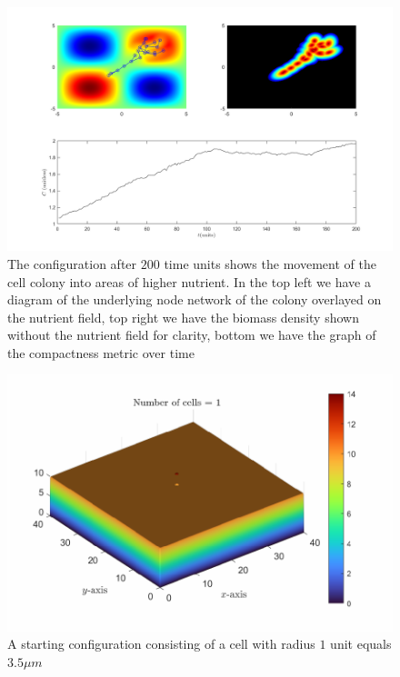 \begin{figure}[h]
    \centering
    \includegraphics[width=1\textwidth]{chapter1/figures/sine_wave_nutrient_field.png}
    \caption{The configuration after $200$ time units shows the movement of the cell colony
     into areas of higher nutrient. In the top left we have a diagram of the underlying
     node network of the colony overlayed on the nutrient field, top right we have the 
     biomass density shown without the nutrient field for clarity, bottom we have the graph 
     of the compactness metric over time}
    \label{fig:sine_wave_start}
    \end{figure}
\filbreak

\begin{figure}[h]
\centering
\includegraphics[width=1\textwidth]{chapter1/figures/ColonySimulationDemoNutrientField_N_1.pdf}
\caption{A starting configuration consisting of a cell with radius $1$ unit equals $3.5 \mu m$}
\label{fig:ColonySimulationStartingCellNutrientField}
\end{figure}
\filbreak



